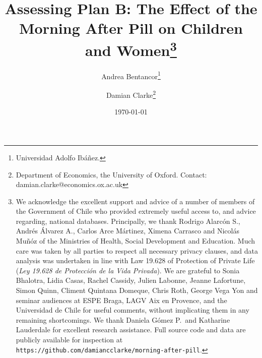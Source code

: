 \documentclass{article}[11pt,subeqn]
\title{Assessing Plan B: The Effect of the Morning After Pill on Children and Women\footnote{We acknowledge
the excellent support and advice of a number of members of the Government of Chile who provided extremely 
useful access to, and advice regarding, national databases.  Principally, we thank Rodrigo Alarc\'on S., 
Andr\'es \'Alvarez A., Carlos Arce M\'artinez, Ximena Carrasco and Nicol\'as Mu\~n\'oz of the Ministries 
of Health, Social Development and Education.  Much care was taken by all parties to respect all necessary 
privacy clauses, and data analysis was undertaken in line with Law 19.628 of Protection of Private Life 
(\emph{Ley 19.628 de Protecci\'on de la Vida Privada}).  We are grateful to Sonia Bhalotra, Lidia Casas,
Rachel Cassidy, Julien Labonne, Jeanne Lafortune, Simon Quinn, Climent Quintana Domeque, Chris Roth, George 
Vega Yon and seminar audiences at ESPE Braga, LAGV Aix en Provence, and the Universidad de Chile for useful 
comments, without implicating them in any remaining shortcomings.  We thank Daniela G\'omez P.\ and Katharine 
Lauderdale for excellent research assistance.  Full source code and data are publicly available for inspection 
at \texttt{https://github.com/damiancclarke/morning-after-pill}.}}
\author{Andrea Bentancor\thanks{Universidad Adolfo Ib\'a\~nez.} 
\and Damian Clarke\thanks{Department of Economics, the University of Oxford.  
Contact: damian.clarke@economics.ox.ac.uk}}
\date{\today}
\begin{document}
\begin{spacing}{1.4}

\maketitle




%


\end{spacing}
\end{document}
